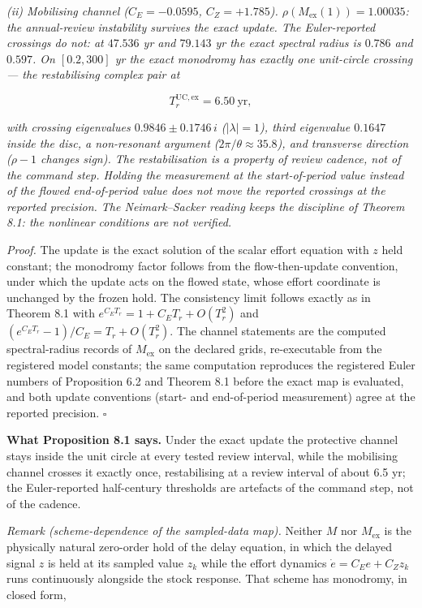 \documentclass[11pt]{article}
\begin{document}
\emph{(ii) Mobilising channel (\(C_E = -0.0595\), \(C_Z = +1.785\)).
\(\rho(M_{\mathrm{ex}}(1)) = 1.00035\): the annual-review instability
survives the exact update. The Euler-reported crossings do not: at
\(47.536\) yr and \(79.143\) yr the exact spectral radius is \(0.786\)
and \(0.597\). On \([0.2, 300]\) yr the exact monodromy has exactly one
unit-circle crossing --- the restabilising complex pair at}

\[T_r^{\mathrm{UC,ex}} = 6.50\ \mathrm{yr},\]

\emph{with crossing eigenvalues \(0.9846 \pm 0.1746\,i\)
(\(|\lambda| = 1\)), third eigenvalue \(0.1647\) inside the disc, a
non-resonant argument (\(2\pi/\theta \approx 35.8\)), and transverse
direction (\(\rho - 1\) changes sign). The restabilisation is a property
of review cadence, not of the command step. Holding the measurement at
the start-of-period value instead of the flowed end-of-period value does
not move the reported crossings at the reported precision. The
Neimark--Sacker reading keeps the discipline of Theorem 8.1: the
nonlinear conditions are not verified.}

\emph{Proof.} The update is the exact solution of the scalar effort
equation with \(z\) held constant; the monodromy factor follows from the
flow-then-update convention, under which the update acts on the flowed
state, whose effort coordinate is unchanged by the frozen hold. The
consistency limit follows exactly as in Theorem 8.1 with
\(e^{C_E T_r} = 1 + C_E T_r + O(T_r^2)\) and
\((e^{C_E T_r} - 1)/C_E = T_r + O(T_r^2)\). The channel statements are
the computed spectral-radius records of \(M_{\mathrm{ex}}\) on the
declared grids, re-executable from the registered model constants; the
same computation reproduces the registered Euler numbers of Proposition
6.2 and Theorem 8.1 before the exact map is evaluated, and both update
conventions (start- and end-of-period measurement) agree at the reported
precision. \ensuremath{\square}

\textbf{What Proposition 8.1 says.} Under the exact update the
protective channel stays inside the unit circle at every tested review
interval, while the mobilising channel crosses it exactly once,
restabilising at a review interval of about 6.5 yr; the Euler-reported
half-century thresholds are artefacts of the command step, not of the
cadence.

\emph{Remark (scheme-dependence of the sampled-data map).} Neither \(M\)
nor \(M_{\mathrm{ex}}\) is the physically natural zero-order hold of the
delay equation, in which the delayed signal \(z\) is held at its sampled
value \(z_k\) while the effort dynamics \(\dot e = C_E e + C_Z z_k\)
runs continuously alongside the stock response. That scheme has
monodromy, in closed form,
\end{document}
